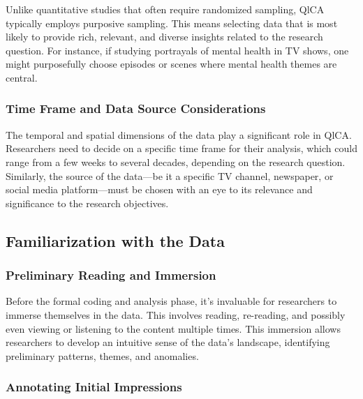 \documentclass[
  b5paper]{book}
\begin{document}
Unlike quantitative studies that often require randomized sampling, QlCA typically employs purposive sampling. This means selecting data that is most likely to provide rich, relevant, and diverse insights related to the research question. For instance, if studying portrayals of mental health in TV shows, one might purposefully choose episodes or scenes where mental health themes are central.

\hypertarget{time-frame-and-data-source-considerations}{%
\subsubsection*{Time Frame and Data Source Considerations}\label{time-frame-and-data-source-considerations}}

The temporal and spatial dimensions of the data play a significant role in QlCA. Researchers need to decide on a specific time frame for their analysis, which could range from a few weeks to several decades, depending on the research question. Similarly, the source of the data---be it a specific TV channel, newspaper, or social media platform---must be chosen with an eye to its relevance and significance to the research objectives.

\hypertarget{familiarization-with-the-data}{%
\subsection*{Familiarization with the Data}\label{familiarization-with-the-data}}

\hypertarget{preliminary-reading-and-immersion}{%
\subsubsection*{Preliminary Reading and Immersion}\label{preliminary-reading-and-immersion}}

Before the formal coding and analysis phase, it's invaluable for researchers to immerse themselves in the data. This involves reading, re-reading, and possibly even viewing or listening to the content multiple times. This immersion allows researchers to develop an intuitive sense of the data's landscape, identifying preliminary patterns, themes, and anomalies.

\hypertarget{annotating-initial-impressions}{%
\subsubsection*{Annotating Initial Impressions}\label{annotating-initial-impressions}}
\end{document}
